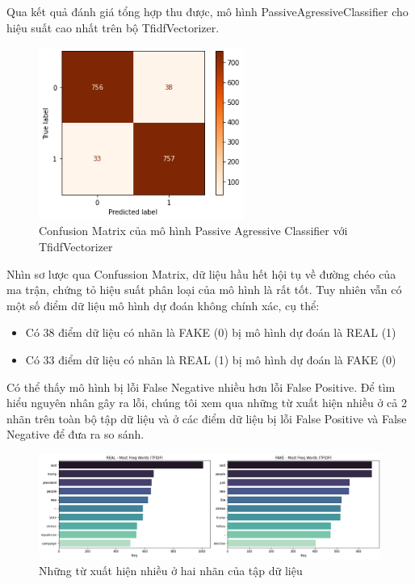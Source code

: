 \documentclass[12pt,a4paper,oneside]{book}
\begin{document}
Qua kết quả đánh giá tổng hợp thu được, mô hình PassiveAgressiveClassifier cho hiệu suất cao nhất trên bộ TfidfVectorizer.
\begin{figure}[H]
	\centering
	\captionsetup{width=0.6\textwidth}
	\includegraphics[width=0.6\textwidth]{tfpa_2}
	\caption{Confusion Matrix của mô hình Passive Agressive Classifier với TfidfVectorizer}
\end{figure}
Nhìn sơ lược qua Confussion Matrix, dữ liệu hầu hết hội tụ về đường chéo của ma trận, chứng tỏ hiệu suất phân loại của mô hình là rất tốt. Tuy nhiên vẫn có một số điểm dữ liệu mô hình dự đoán không chính xác, cụ thể:
\begin{itemize}
\item Có 38 điểm dữ liệu có nhãn là FAKE (0) bị mô hình dự đoán là REAL (1)
\item Có 33 điểm dữ liệu có nhãn là REAL (1) bị mô hình dự đoán là FAKE (0)
\end{itemize}

Có thể thấy mô hình bị lỗi False Negative nhiều hơn lỗi False Positive.
Để tìm hiểu nguyên nhân gây ra lỗi, chúng tôi xem qua những từ xuất hiện nhiều ở cả 2 nhãn trên toàn bộ tập dữ liệu và ở các điểm dữ liệu bị lỗi False Positive và False Negative để đưa ra so sánh.
\begin{figure}[H]
	\centering
	\includegraphics[width=1\textwidth]{frequentdata}
	\caption{Những từ xuất hiện nhiều ở hai nhãn của tập dữ liệu}
\end{figure}
\end{document}
